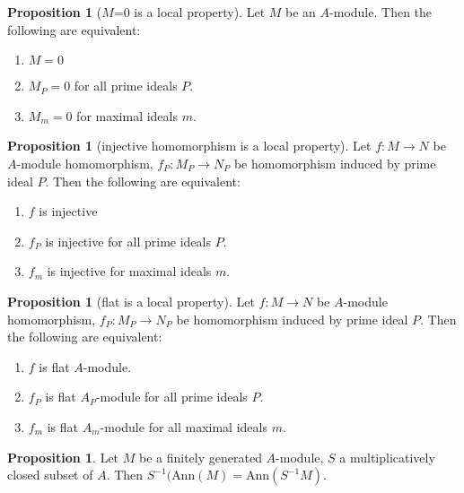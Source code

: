 \documentclass[a4paper,12pt]{article}
\theoremstyle{definition}
\newtheorem{prop}[defn]{Proposition}
\begin{document}
\begin{prop}[$M$=0 is a local property]
    Let $M$ be an $A$-module. Then the following are equivalent:
    \begin{enumerate}[(1)]
        \item $M = 0$
        \item $M_P=0$ for all prime ideals $P$.
        \item $M_m=0$ for maximal ideals $m$.
    \end{enumerate}
    \label{proposition:M=0 is a local property}
\end{prop}
\begin{prop}[injective homomorphism is a local property]
    Let $f:M\rightarrow N$ be $A$-module homomorphism, $f_P:M_P\rightarrow N_P$ be homomorphism induced by prime ideal $P$. Then the following are equivalent:
    \begin{enumerate}[(1)]
        \item $f$ is injective
        \item $f_P$ is injective for all prime ideals $P$.
        \item $f_m$ is injective for maximal ideals $m$.
    \end{enumerate}
\end{prop}
\begin{prop}[flat is a local property]
    Let $f:M\rightarrow N$ be $A$-module homomorphism, $f_P:M_P\rightarrow N_P$ be homomorphism induced by prime ideal $P$. Then the following are equivalent:
    \begin{enumerate}[(1)]
        \item $f$ is flat $A$-module.
        \item $f_P$ is flat $A_P$-module for all prime ideals $P$.
        \item $f_m$ is flat $A_m$-module for all maximal ideals $m$.
    \end{enumerate}
\end{prop}
\begin{prop}
    Let $M$ be a finitely generated $A$-module, $S$ a multiplicatively
    closed subset of $A$. Then $S^{-1}(\text{Ann}(M)=\text{Ann}(S^{-1}M)$.
    \label{proposition:S-1 (finitely generated case)}
\end{prop}
\end{document}
